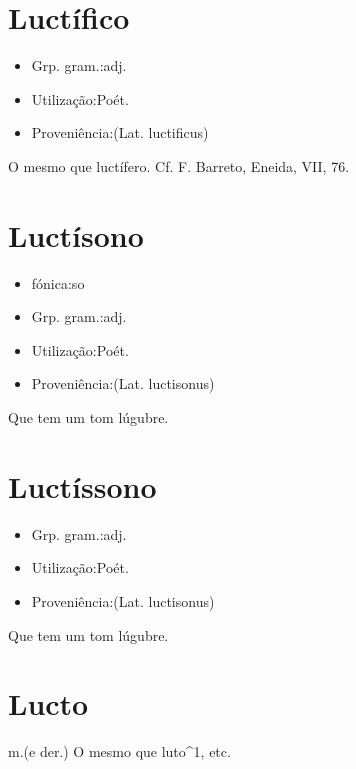 \section{Luctífico}
\begin{itemize}
\item {Grp. gram.:adj.}
\end{itemize}
\begin{itemize}
\item {Utilização:Poét.}
\end{itemize}
\begin{itemize}
\item {Proveniência:(Lat. \textunderscore luctificus\textunderscore )}
\end{itemize}
O mesmo que \textunderscore luctífero\textunderscore . Cf. F. Barreto, \textunderscore Eneida\textunderscore , VII, 76.
\section{Luctísono}
\begin{itemize}
\item {fónica:so}
\end{itemize}
\begin{itemize}
\item {Grp. gram.:adj.}
\end{itemize}
\begin{itemize}
\item {Utilização:Poét.}
\end{itemize}
\begin{itemize}
\item {Proveniência:(Lat. \textunderscore luctisonus\textunderscore )}
\end{itemize}
Que tem um tom lúgubre.
\section{Luctíssono}
\begin{itemize}
\item {Grp. gram.:adj.}
\end{itemize}
\begin{itemize}
\item {Utilização:Poét.}
\end{itemize}
\begin{itemize}
\item {Proveniência:(Lat. \textunderscore luctisonus\textunderscore )}
\end{itemize}
Que tem um tom lúgubre.
\section{Lucto}
\textunderscore m.\textunderscore  (e der.)
O mesmo que \textunderscore luto\textunderscore ^1, etc.
